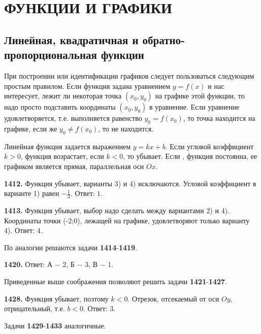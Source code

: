 \section{ФУНКЦИИ И ГРАФИКИ}
\subsection{Линейная, квадратичная и обратно- пропорциональная функции}


При построении или идентификации графиков следует пользоваться следующим простым правилом. Если  функция задана \newline уравнением $y=f(x)$ и нас интересует, лежит ли некоторая точка $\left(x_0,y_0\right)$ на графике этой функции, то надо просто подставить координаты $\left(x_0,y_0\right)$ в уравнение. Если уравнение удовлетворяется, т.е. выполняется равенство $y_0=f(x_0)$, то точка находится на графике, если же $y_0\neq f(x_0)$, то не находится.

Линейная функция задается выражением $y=kx+b$. Если угловой коэффициент $k>0$, функция возрастает, если $k<0$, то убывает. Если , функция постоянна, ее графиком является прямая, параллельная оси $Ox$.

\textbf{1412.}  Функция убывает, варианты 3) и 4) исключаются. Угловой коэффициент в варианте 1) равен $-\frac{1}{3}$. \newline \null \hspace*{\fill} Ответ: $1$.   

\textbf{1413.}  Функция убывает, выбор надо сделать между вариантами 2) и 4). Координаты точки (-2;0), лежащей на графике, удовлетворяют только варианту 4). \newline \null \hspace*{\fill} Ответ: $4$. 

По аналогии решаются задачи \textbf{1414}-\textbf{1419}.

\textbf{1420.} \newline \null \hspace*{\fill} Ответ: А $-$ 2, Б $-$ 3, В $-$ 1.

Приведенные выше соображения позволяют решить задачи \newline \textbf{1421}-\textbf{1427}.

\textbf{1428.}  Функция убывает, поэтому $k<0$. Отрезок, отсекаемый от оси $Oy$, отрицательный, т.е. $b<0$. \newline \null \hspace*{\fill} Ответ: $3$. 

Задачи \textbf{1429}-\textbf{1433}  аналогичные.

